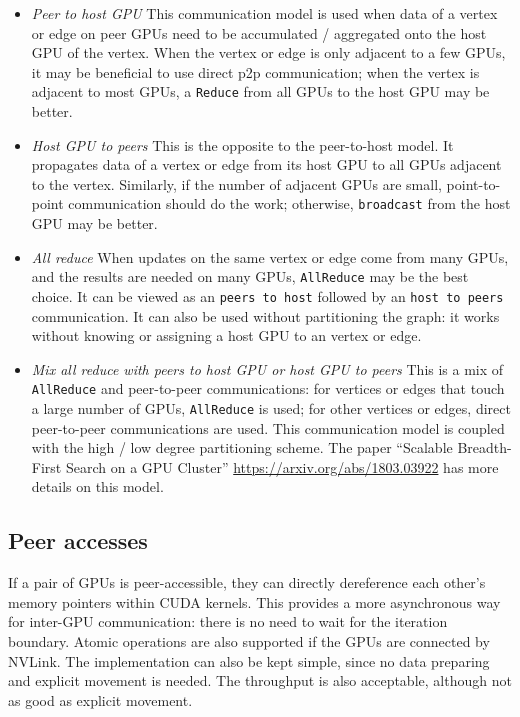 \documentclass[10pt,oneside]{memoir}
\begin{document}
\begin{itemize}
\item
  \emph{Peer to host GPU} This communication model is used when data of
  a vertex or edge on peer GPUs need to be accumulated / aggregated onto
  the host GPU of the vertex. When the vertex or edge is only adjacent
  to a few GPUs, it may be beneficial to use direct p2p communication;
  when the vertex is adjacent to most GPUs, a \texttt{Reduce} from all
  GPUs to the host GPU may be better.
\item
  \emph{Host GPU to peers} This is the opposite to the peer-to-host
  model. It propagates data of a vertex or edge from its host GPU to all
  GPUs adjacent to the vertex. Similarly, if the number of adjacent GPUs
  are small, point-to-point communication should do the work; otherwise,
  \texttt{broadcast} from the host GPU may be better.
\item
  \emph{All reduce} When updates on the same vertex or edge come from
  many GPUs, and the results are needed on many GPUs, \texttt{AllReduce}
  may be the best choice. It can be viewed as an
  \texttt{peers\ to\ host} followed by an \texttt{host\ to\ peers}
  communication. It can also be used without partitioning the graph: it
  works without knowing or assigning a host GPU to an vertex or edge.
\item
  \emph{Mix all reduce with peers to host GPU or host GPU to peers} This
  is a mix of \texttt{AllReduce} and peer-to-peer communications: for
  vertices or edges that touch a large number of GPUs,
  \texttt{AllReduce} is used; for other vertices or edges, direct
  peer-to-peer communications are used. This communication model is
  coupled with the high / low degree partitioning scheme. The paper
  ``Scalable Breadth-First Search on a GPU Cluster''
  \url{https://arxiv.org/abs/1803.03922} has more details on this model.
\end{itemize}

\hypertarget{peer-accesses}{%
\subsection{Peer accesses}\label{peer-accesses}}

If a pair of GPUs is peer-accessible, they can directly dereference each
other's memory pointers within CUDA kernels. This provides a more
asynchronous way for inter-GPU communication: there is no need to wait
for the iteration boundary. Atomic operations are also supported if the
GPUs are connected by NVLink. The implementation can also be kept
simple, since no data preparing and explicit movement is needed. The
throughput is also acceptable, although not as good as explicit
movement.
\end{document}
